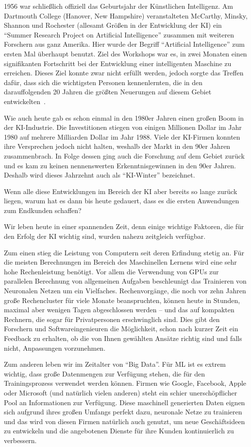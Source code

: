 1956 war schließlich offiziell das Geburtsjahr der Künstlichen Intelligenz. Am Dartmouth College (Hanover, New Hampshire) veranstalteten McCarthy, Minsky, Shannon und Rochester (allesamt Größen in der Entwicklung der \gls{KI}) ein "`Summer Research Project on Artificial Intelligence"' zusammen mit weiteren Forschern aus ganz Amerika. Hier wurde der Begriff "`Artificial Intelligence"' zum ersten Mal überhaupt benutzt. Ziel des Workshops war es, in zwei Monaten einen signifikanten Fortschritt bei der Entwicklung einer intelligenten Maschine zu erreichen. Dieses Ziel konnte zwar nicht erfüllt werden, jedoch sorgte das Treffen dafür, dass sich die wichtigsten Personen kennenlernten, die in den darauffolgenden 20 Jahren die größten Neuerungen auf diesem Gebiet entwickelten~\cite{Russell.2012}.

Wie auch heute gab es schon einmal in den 1980er Jahren einen großen Boom in der KI-Industrie. Die Investitionen stiegen von einigen Millionen Dollar im Jahr 1980 auf mehrere Milliarden Dollar im Jahr 1988. Viele der \gls{KI}-Firmen konnten ihre Versprechen jedoch nicht halten, weshalb der Markt in den 90er Jahren zusammenbrach. In Folge dessen ging auch die Forschung auf dem Gebiet zurück und es kam zu keinen nennenswerten Erkenntnisgewinnen in den 90er Jahren. Deshalb wird dieses Jahrzehnt auch als "`\gls{KI}-Winter"' bezeichnet.

Wenn alle diese Entwicklungen im Bereich der \gls{KI} aber bereits so lange zurück liegen, warum hat es dann bis heute gedauert, dass es die ersten Anwendungen zum Endkunden schaffen?

Wir leben heute in einer spannenden Zeit, denn einige wichtige Faktoren, die für den Erfolg der \gls{KI} wichtig sind, wurden nahezu zeitgleich verfügbar.

Zum einen stieg die Leistung von Computern seit deren Erfindung stetig an. Für die meisten Berechnungen im Bereich des Maschinellen Lernens wird eine sehr hohe Rechenleistung benötigt. Vor allem die Verwendung von GPUs zur parallelen Berechnung von allgemeinen Aufgaben beschleunigt das Trainieren von Neuronalen Netzen um ein Vielfaches. Rechenvorgänge, die noch vor zehn Jahren große Rechencluster für viele Monate beanspruchten, können heute in Stunden, maximal aber wenigen Tagen abgeschlossen werden -- und das auf kompakten Rechnern, die sogar für Privatpersonen erschwinglich sind. Dies gibt den Forschern und Softwareingenieuren die Möglichkeit, schon nach kurzer Zeit ein Feedback zu erhalten, ob die von Ihnen gewählten Ansätze richtig sind und falls nicht, Anpassungen vorzunehmen.

Zum anderen leben wir im Zeitalter von "`Big Data"'. Für \gls{ML} ist es extrem wichtig, dass große Datenmengen zur Verfügung stehen, die für den Trainingsprozess verwendet werden können. Firmen wie Google, Facebook, Apple oder Microsoft (und natürlich vielen anderen) steht ein schier unerschöpflicher Pool an Informationen zur Verfügung. Diese maschinell generierten Daten eignen sich aufgrund ihres großen Umfangs perfekt dazu, neuronale Netze zu trainieren und das wird von diesen Firmen natürlich auch genutzt, um neue Geschäftsideen zu entwickeln und die angebotenen Dienste für ihre Kunden kontinuierlich zu verbessern.